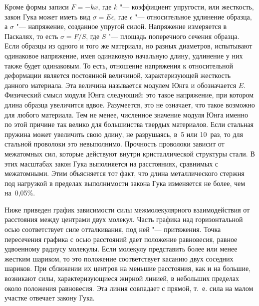 \documentclass[a4paper, 12pt]{extarticle}
\newcommand{\eps}{\epsilon}
\begin{document}
Кроме формы записи $F = - kx$, где $k$ "--- коэффициент упругости, или жесткость, закон Гука может иметь вид $\sigma = E \eps$, где $\eps$ "--- относительное удлинение образца, а $\sigma$ "--- напряжение, созданное упругой силой. Напряжение измеряется в Паскалях, то есть $\sigma = F/S$, где $S$ "--- площадь поперечного сечения образца. Если образцы из одного и того же материала, но разных диаметров, испытывают одинаковое напряжение, имея одинаковую начальную длину, удлинение у них также будет одинаковым. То есть, отношение напряжения к относительной деформации является постоянной величиной, характеризующей жесткость данного материала. Эта величина называется модулем Юнга и обозначается $E$. Физический смысл модуля Юнга следующий: это такое напряжение, при котором длина образца  увеличится вдвое. Разумеется, это не означает, что такое возможно для любого материала. Тем не менее, численное значение модуля Юнга именно по этой причине так велико для большинства твердых материалов. Если стальная пружина может увеличить свою длину, не разрушаясь, в~5 или 10~раз, то для стальной проволоки это невыполнимо. Прочность проволоки зависит от межатомных сил, которые действуют внутри кристаллической структуры стали. В этих масштабах закон Гука выполняется на расстояниях, сравнимых с межатомными. Этим объясняется тот факт, что длина металлического стержня под нагрузкой в пределах выполнимости закона Гука изменяется не более, чем на~0,05\%.

Ниже приведен график зависимости силы межмолекулярного взаимодействия от расстояния между центрами двух молекул. Часть графика над горизонтальной осью соответствует силе отталкивания, под ней "--- притяжения. Точка пересечения графика с осью расстояний дает положение равновесия, равное удвоенному радиусу молекулы. Если молекулу представить более или менее жестким шариком, то это положение соответствует касанию двух соседних шариков. При сближении их центров на меньшие расстояния, как и на большие, возникают силы, характеризующиеся жирной линией, в небольших пределах около положения равновесия. Эта линия совпадает с прямой, т.~е. сила на малом участке отвечает закону Гука. %

\begin{figure}[h]
\begin{center}
\end{center}
\caption{\label{fig:m9b-plot}}
\end{figure}
\end{document}
